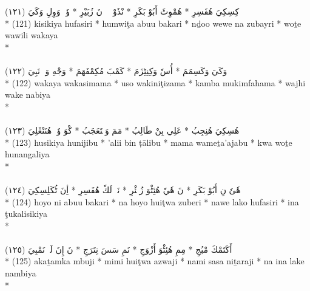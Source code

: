 \documentclass[a4paper, 12pt]{report}
\begin{document}
\begin{center}
\textarabic{(١٢١) \textcolor{mygreen}{كِسِكِيَ هُفَسِرِ  * هُمْوِٹَ أَبُوْ بَكَرِ  * نْدٗوْ وٖوٖ نَ زُبَيْرِ  * وٗتٖ وَوِلِ وَكَيَ }} \\* 
(121) kisikiya hufasiri  * humwiţa abuu bakari  * nḏoo wewe na zubayri  * woṯe wawili wakaya  \\* 
 \\ 
\\[8mm] 

\textarabic{(١٢٢) \textcolor{mygreen}{وَكَيَ وَكَسِمَمَ  * أُسٗ وَكِنِٹِزَمَ  * كَمْبَ مُكِمْفَهَمَ  * وَجْهِ وَكٖ نَبِيَ }} \\* 
(122) wakaya wakasimama  * uso wakiniţizama  * kamba mukimfahama  * wajhi wake nabiya  \\* 
 \\ 
\\[8mm] 

\textarabic{(١٢٣) \textcolor{mygreen}{هُسِكِيَ هُنِجِبُ  * عَلِي بِنْ طَالِبُ  * مَمَ وَمٖتَعَجَبُ  * كْوَ وٗتٖ هُنَنْڠَلِيَ }} \\* 
(123) husikiya hunijibu  * 'alii bin ṭālibu  * mama wameṯa'ajabu  * kwa woṯe hunangaliya  \\* 
 \\ 
\\[8mm] 

\textarabic{(١٢٤) \textcolor{mygreen}{هٗىٗ نِ أَبُوْ بَكَرِ  * نَ هٗيٗ هُئِٹْوَ زُبٖئْرِ  * نَوٖ لَكٗ هُفَسِرِ  * أِنَ ٹُكَلِسِكِيَ }} \\* 
(124) hoyo ni abuu bakari  * na hoyo huiţwa zuberi  * nawe lako hufasiri  * ina ţukalisikiya  \\* 
 \\ 
\\[8mm] 

\textarabic{(١٢٥) \textcolor{mygreen}{أَكَتَمْكَ مْبُجِ  * مِمِ هُئِٹْوَ أَزْوَجِ  * نَمِ سَسَ نِتَرَجِ  * نَ إِنَ لَكٖ نَمْبِيَ }} \\* 
(125) akaṯamka mbuji  * mimi huiţwa azwaji  * nami sasa niṯaraji  * na ina lake nambiya  \\* 
 \\ 
\\[8mm] 


\end{center}
\end{document}
